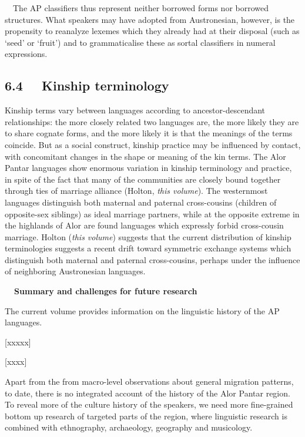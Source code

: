 \ \ The AP classifiers thus represent neither borrowed forms nor borrowed structures. What speakers may have adopted from Austronesian, however, is the propensity to reanalyze lexemes which they already had at their disposal (such as {\textquoteleft}seed{\textquoteright} or {\textquoteleft}fruit{\textquoteright}) and to grammaticalise these as sortal classifiers in numeral expressions. 

\subsection[6.4 \ \ Kinship terminology]{6.4 \ \ Kinship terminology}
Kinship terms vary between languages according to ancestor-descendant relationships: the more closely related two languages are, the more likely they are to share cognate forms, and the more likely it is that the meanings of the terms coincide. But as a social construct, kinship practice may be influenced by contact, with concomitant changes in the shape or meaning of the kin terms. The Alor Pantar languages show enormous variation in kinship terminology and practice, in spite of the fact that many of the communities are closely bound together through ties of marriage alliance (Holton, \textit{this volume}). The westernmost languages distinguish both maternal and paternal cross-cousins (children of opposite-sex siblings) as ideal marriage partners, while at the opposite extreme in the highlands of Alor are found languages which expressly forbid cross-cousin marriage. Holton (\textit{this volume}) suggests that the current distribution of kinship terminologies suggests a recent drift toward symmetric exchange 
systems which distinguish both maternal and paternal cross-cousins, perhaps under the influence of neighboring Austronesian languages. 

{\bfseries
\ \ Summary and challenges for future research}

The current volume provides information on the linguistic history of the AP languages. 

[xxxxx]

[xxxx]

Apart from the from macro-level observations about general migration patterns, to date, there is no integrated account of the history of the Alor Pantar region. To reveal more of the culture history of the speakers, we need more fine-grained bottom up research of targeted parts of the region, where linguistic research is combined with ethnography, archaeology, geography and musicology. 

